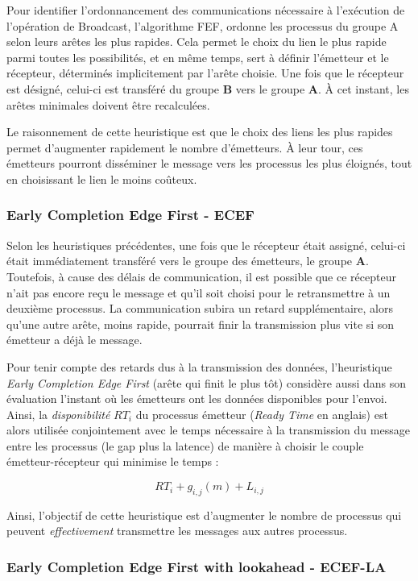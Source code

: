 Pour identifier l'ordonnancement des communications nécessaire à l'exécution
de l'opération de Broadcast, l'algorithme FEF, ordonne les processus
du groupe A selon leurs arêtes les plus rapides. Cela permet le choix
du lien le plus rapide parmi toutes les possibilités, et en même temps,
sert à définir l'émetteur et le récepteur, déterminés implicitement
par l'arête choisie. Une fois que le récepteur est désigné, celui-ci
est transféré du groupe \textbf{B} vers le groupe \textbf{A}. À cet
instant, les arêtes minimales doivent être recalculées.

Le raisonnement de cette heuristique est que le choix des liens les
plus rapides permet d'augmenter rapidement le nombre d'émetteurs.
À leur tour, ces émetteurs pourront disséminer le message vers les
processus les plus éloignés, tout en choisissant le lien le moins
coûteux.


\subsubsection*{Early Completion Edge First - ECEF}

Selon les heuristiques précédentes, une fois que le récepteur était
assigné, celui-ci était immédiatement transféré vers le groupe des
émetteurs, le groupe \textbf{A}. Toutefois, à cause des délais de
communication, il est possible que ce récepteur n'ait pas encore reçu
le message et qu'il soit choisi pour le retransmettre à un deuxième
processus. La communication subira un retard supplémentaire, alors
qu'une autre arête, moins rapide, pourrait finir la transmission plus
vite si son émetteur a déjà le message. 

Pour tenir compte des retards dus à la transmission des données, l'heuristique
\emph{Early Completion Edge First} (arête qui finit le plus tôt) considère
aussi dans son évaluation l'instant où les émetteurs ont les données
disponibles pour l'envoi. Ainsi, la \emph{disponibilité} $RT_{i}$
du processus émetteur (\emph{Ready Time} en anglais) est alors utilisée
conjointement avec le temps nécessaire à la transmission du message
entre les processus (le gap plus la latence) de manière à choisir
le couple émetteur-récepteur qui minimise le temps : 

\[
RT_{i}+g_{i,j}(m)+L_{i,j}\]


Ainsi, l'objectif de cette heuristique est d'augmenter le nombre de
processus qui peuvent \emph{effectivement} transmettre les messages
aux autres processus.


\subsubsection*{Early Completion Edge First with lookahead - ECEF-LA}

